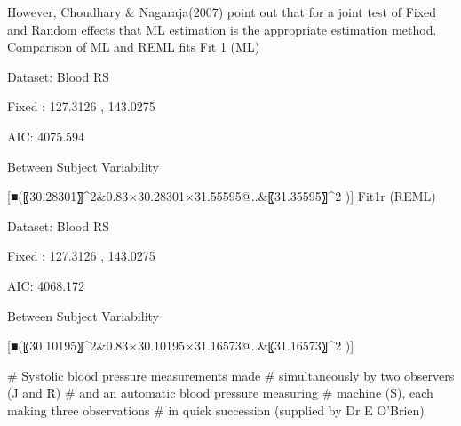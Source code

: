 However, Choudhary & Nagaraja(2007) point out  that for a joint test of Fixed and Random effects that ML estimation is the appropriate estimation method.
Comparison of ML and REML fits
Fit 1 (ML)

Dataset: Blood RS

Fixed : 127.3126 , 143.0275

AIC: 4075.594

Between Subject Variability

[■(〖30.28301〗^2&0.83×30.28301×31.55595@..&〖31.35595〗^2 )]	Fit1r (REML)

Dataset: Blood RS

Fixed : 127.3126 , 143.0275

AIC: 4068.172

Between Subject Variability

[■(〖30.10195〗^2&0.83×30.10195×31.16573@..&〖31.16573〗^2 )]



# Systolic blood pressure measurements made 
# simultaneously by two observers (J and R) 
# and an automatic blood pressure measuring
# machine (S), each making three observations 
# in quick succession (supplied by Dr E O'Brien)

